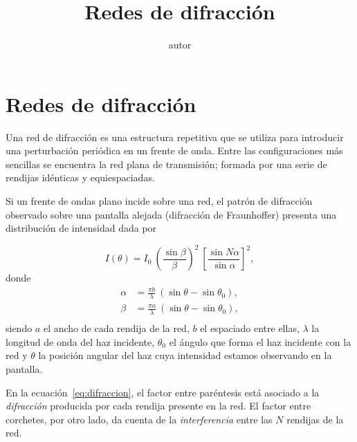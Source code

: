\documentclass[epj]{svjour}
\def \practica {Redes de difracci\'on}
\begin{document}
\title{\practica}    
\author{autor}

\maketitle

\section{Redes de difracci\'on}

Una red de difracci\'on es una estructura repetitiva que se utiliza para
introducir una perturbaci\'on peri\'odica en un frente de onda. Entre las
configuraciones m\'as sencillas se encuentra la red plana de transmisi\'on;
formada por una serie de rendijas id\'enticas y equiespaciadas. 

Si un frente de ondas plano incide sobre una red, el patr\'on de difracci\'on
observado sobre una pantalla alejada (difracci\'on de Fraunhoffer) presenta
una distribuci\'on de intensidad dada por

\begin{equation}
    I(\theta) = I_0 \: \left( \frac{\sin \beta}{\beta} \right)^2 \: 
    \left[ \frac{\sin N\alpha}{\sin \alpha}\right]^2,
    \label{eq:difraccion}
\end{equation}
donde 
\begin{align*}
    \alpha &= \frac{\pi b}{\lambda} \: 
    \left(\sin \theta - \sin \theta_0 \right), \\
    \beta  &= \frac{\pi a}{\lambda} \: 
    \left(\sin \theta - \sin \theta_0 \right), \\
\end{align*}
siendo $a$ el ancho de cada rendija de la red, $b$ el espaciado entre ellas,
$\lambda$ la longitud de onda del haz incidente, 
$\theta_0$ el \'angulo que forma el haz incidente con la red y $\theta$ la
posici\'on angular del haz cuya intensidad estamos observando en la pantalla.

En la ecuaci\'on~\eqref{eq:difraccion}, el factor entre par\'entesis 
est\'a asociado a la {\it difracci\'on} producida por cada rendija
presente en la red. El factor entre corchetes, por otro lado, da cuenta de la 
{\it interferencia} entre las $N$ rendijas de la red. 
\end{document}
